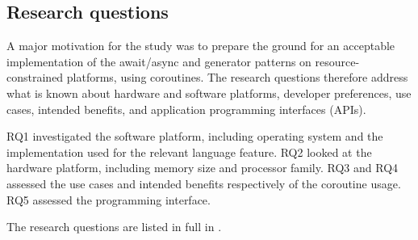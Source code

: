 \subsection{Research questions}

A major motivation for the study was to prepare the ground for an acceptable implementation of the await/async and generator patterns on resource-constrained platforms, using coroutines. The research questions therefore address what is known about hardware and software platforms, developer preferences, use cases, intended benefits, and application programming interfaces (APIs).

RQ1 investigated the software platform, including \DIFdelbegin {}\DIFdelend \DIFaddbegin {}\DIFaddend operating system and the implementation used for the relevant language feature. RQ2 looked at the hardware platform, including memory size and processor family. RQ3 and RQ4 assessed the use cases and intended benefits respectively of the coroutine usage. RQ5 assessed the programming interface.

The research questions are listed in full in \DIFdelbegin {}\DIFdelend \DIFaddbegin {}\DIFaddend .

